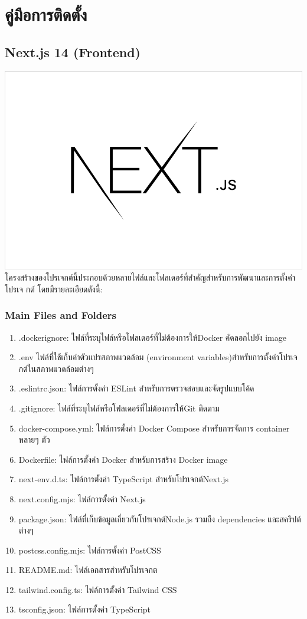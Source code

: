 \chapter{คู่มือการติดตั้ง}
\section{Next.js 14 (Frontend)}
  \includegraphics[width=1\textwidth]{image/appendix/nextjs.png}
  \qquad โครงสร้างของโปรเจกต์นี้ประกอบด้วยหลายไฟล์และโฟลเดอร์ที่สําคัญสําหรับการพัฒนาและการตั้งค่าโปรเจ
กต์ โดยมีรายละเอียดดังนี้:
  \subsection{Main Files and Folders}
    \begin{enumerate}
      \item .dockerignore: ไฟล์ที่ระบุไฟล์หรือโฟลเดอร์ที่ไม่ต้องการให้Docker คัดลอกไปยัง image
      \item .env ไฟล์ที่ใช้เก็บค่าตัวแปรสภาพแวดล้อม (environment variables)สําหรับการตั้งค่าโปรเจกต์ในสภาพแวดล้อมต่างๆ
      \item .eslintrc.json: ไฟล์การตั้งค่า ESLint สําหรับการตรวจสอบและจัดรูปแบบโค้ด
      \item .gitignore: ไฟล์ที่ระบุไฟล์หรือโฟลเดอร์ที่ไม่ต้องการให้Git ติดตาม
      \item docker-compose.yml: ไฟล์การตั้งค่า Docker Compose สําหรับการจัดการ container
หลายๆ ตัว
      \item Dockerfile: ไฟล์การตั้งค่า Docker สําหรับการสร้าง Docker image
      \item next-env.d.ts: ไฟล์การตั้งค่า TypeScript สําหรับโปรเจกต์Next.js
      \item next.config.mjs: ไฟล์การตั้งค่า Next.js
      \item package.json: ไฟล์ที่เก็บข้อมูลเกี่ยวกับโปรเจกต์Node.js รวมถึง dependencies และสคริปต์
ต่างๆ
      \item postcss.config.mjs: ไฟล์การตั้งค่า PostCSS
      \item README.md: ไฟล์เอกสารสําหรับโปรเจกต
      \item tailwind.config.ts: ไฟล์การตั้งค่า Tailwind CSS
      \item tsconfig.json: ไฟล์การตั้งค่า TypeScript
    \end{enumerate}

